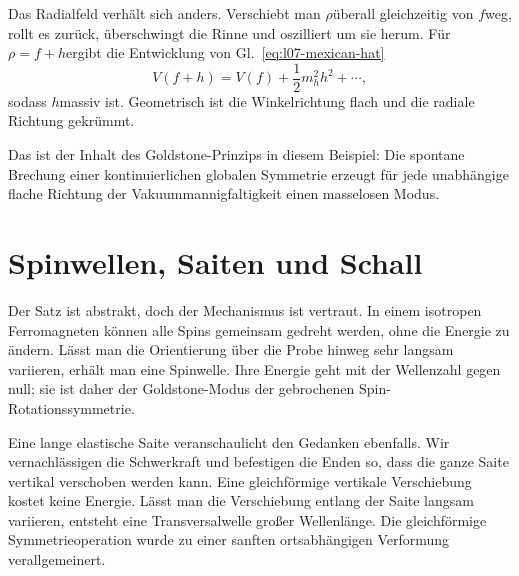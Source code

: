 Das Radialfeld verhält sich anders. Verschiebt man \(\rho\)überall gleichzeitig von \(f\)weg, rollt es zurück, überschwingt die Rinne und oszilliert um sie herum. Für \(\rho=f+h\)ergibt die Entwicklung von Gl.~\eqref{eq:l07-mexican-hat}
\begin{equation}
  V(f+h)=V(f)+\frac12m_h^2h^2+\cdots,
\end{equation}
sodass \(h\)massiv ist. Geometrisch ist die Winkelrichtung flach und die radiale Richtung gekrümmt.

\begin{classroomqa}
\end{classroomqa}

Das ist der Inhalt des Goldstone-Prinzips in diesem Beispiel: Die spontane Brechung einer kontinuierlichen globalen Symmetrie erzeugt für jede unabhängige flache Richtung der Vakuummannigfaltigkeit einen masselosen Modus.

\section{Spinwellen, Saiten und Schall}

Der Satz ist abstrakt, doch der Mechanismus ist vertraut. In einem isotropen Ferromagneten können alle Spins gemeinsam gedreht werden, ohne die Energie zu ändern. Lässt man die Orientierung über die Probe hinweg sehr langsam variieren, erhält man eine Spinwelle. Ihre Energie geht mit der Wellenzahl gegen null; sie ist daher der Goldstone-Modus der gebrochenen Spin-Rotationssymmetrie.

Eine lange elastische Saite veranschaulicht den Gedanken ebenfalls. Wir vernachlässigen die Schwerkraft und befestigen die Enden so, dass die ganze Saite vertikal verschoben werden kann. Eine gleichförmige vertikale Verschiebung kostet keine Energie. Lässt man die Verschiebung entlang der Saite langsam variieren, entsteht eine Transversalwelle großer Wellenlänge. Die gleichförmige Symmetrieoperation wurde zu einer sanften ortsabhängigen Verformung verallgemeinert.

